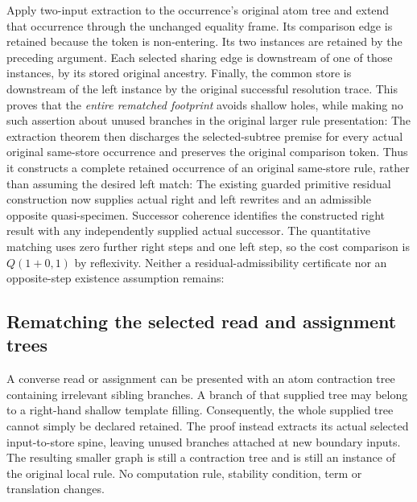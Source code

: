 Apply two-input extraction to the occurrence's original atom tree and extend
that occurrence through the unchanged equality frame. Its comparison edge
is retained because the token is non-entering. Its two instances are retained
by the preceding argument. Each selected sharing edge is downstream of one
of those instances, by its stored original ancestry. Finally, the common store
is downstream of the left instance by the original successful resolution
trace. This proves that the \emph{entire rematched footprint} avoids shallow
holes, while making no such assertion about unused branches in the original
larger rule presentation:
The extraction theorem then discharges the selected-subtree premise for every
actual original same-store occurrence and preserves the original comparison
token. Thus it constructs a complete retained occurrence of an original
same-store rule, rather than assuming the desired left match:
The existing guarded primitive residual construction now supplies actual
right and left rewrites and an admissible opposite quasi-specimen. Successor
coherence identifies the constructed right result with any independently
supplied actual successor. The quantitative matching uses zero further
right steps and one left step, so the cost comparison is $Q(1+0,1)$ by
reflexivity. Neither a residual-admissibility certificate nor an opposite-step
existence assumption remains:
\subsection{Rematching the selected read and assignment trees}
A converse read or assignment can be presented with an atom contraction tree
containing irrelevant sibling branches. A branch of that supplied tree may
belong to a right-hand shallow template filling. Consequently, the whole
supplied tree cannot simply be declared retained. The proof instead extracts
its actual selected input-to-store spine, leaving unused branches attached at
new boundary inputs. The resulting smaller graph is still a contraction tree
and is still an instance of the original local rule. No computation rule,
stability condition, term or translation changes.

